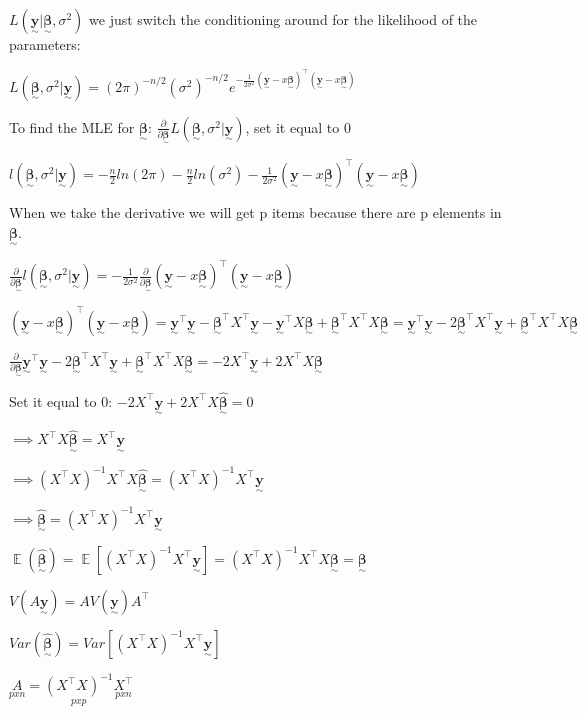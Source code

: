 \documentclass{article}
\newcommand{\svec}[1]{\underset{\sim}{\bm{#1}}} %
\DeclareMathOperator{\EX}{\mathbb{E}} %
\begin{document}
$L(\svec{y}|\svec{\beta}, \sigma^2)$ we just switch the conditioning around for the likelihood of the parameters:

$L(\svec{\beta}, \sigma^2 | \svec{y}) = (2\pi)^{-n/2}(\sigma^2)^{-n/2} e^{-\frac{1}{2\sigma^2}(\svec{y} - x\svec{\beta})^{\top}(\svec{y} - x\svec{\beta})}$

To find the MLE for $\svec{\beta}$: $\frac{\partial}{\partial \svec{\beta}} L(\svec{\beta}, \sigma^2 | \svec{y})$, set it equal to 0

$l(\svec{\beta}, \sigma^2 | \svec{y}) = -\frac{n}{2}ln(2\pi) - \frac{n}{2}ln(\sigma^2) - \frac{1}{2\sigma^2}(\svec{y} - x\svec{\beta})^{\top}(\svec{y} - x\svec{\beta})$

When we take the derivative we will get p items because there are p elements in $\svec{\beta}$. 

$\frac{\partial}{\partial \svec{\beta}} l(\svec{\beta}, \sigma^2 | \svec{y}) = -\frac{1}{2\sigma^2}\frac{\partial}{\partial \svec{\beta}}(\svec{y} - x\svec{\beta})^{\top}(\svec{y} - x\svec{\beta})$

$(\svec{y} - x\svec{\beta})^{\top}(\svec{y} - x\svec{\beta}) = \svec{y}^{\top}\svec{y} - \svec{\beta}^{\top}X^{\top}\svec{y} - \svec{y}^{\top}X\svec{\beta} + \svec{\beta}^{\top}X^{\top}X\svec{\beta} = \svec{y}^{\top}\svec{y} - 2\svec{\beta}^{\top}X^{\top}\svec{y} + \svec{\beta}^{\top}X^{\top}X\svec{\beta}$

$\frac{\partial}{\partial \svec{\beta}} \svec{y}^{\top}\svec{y} - 2\svec{\beta}^{\top}X^{\top}\svec{y} + \svec{\beta}^{\top}X^{\top}X\svec{\beta} = -2 X^{\top}\svec{y} + 2X^{\top}X\svec{\beta}$

Set it equal to 0: $-2 X^{\top}\svec{y} + 2X^{\top}X\hat{\svec{\beta}} = 0$

$\implies X^{\top}X\hat{\svec{\beta}} = X^{\top}\svec{y}$

$\implies (X^{\top}X)^{-1}X^{\top}X\hat{\svec{\beta}} = (X^{\top}X)^{-1}X^{\top}\svec{y}$

$\implies \hat{\svec{\beta}} = (X^{\top}X)^{-1}X^{\top}\svec{y}$

$\EX(\hat{\svec{\beta}}) = \EX[(X^{\top}X)^{-1}X^{\top}\svec{y}] = (X^{\top}X)^{-1}X^{\top}X\svec{\beta} = \svec{\beta}$

$V(A\svec{y}) = AV(\svec{y})A^{\top}$

$Var(\hat{\svec{\beta}}) = Var[(X^{\top}X)^{-1}X^{\top}\svec{y}]$

$\underset{pxn}{A} = \underset{pxp}{(X^{\top}X)^{-1}}\underset{pxn}{X^{\top}}$
\end{document}
